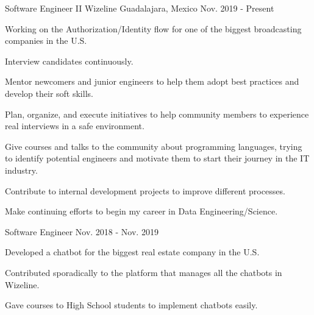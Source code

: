 

\begin{cventries}

  \cventry
    {Software Engineer II} %
    {Wizeline} %
    {Guadalajara, Mexico} %
    {Nov. 2019 - Present} %
    {
      \begin{cvitems} %
        \item {Working on the Authorization/Identity flow for one of the biggest broadcasting companies in the U.S.}
        \item {Interview candidates continuously.}
        \item {Mentor newcomers and junior engineers to help them adopt best practices and develop their soft skills.}
        \item {Plan, organize, and execute initiatives to help community members to experience real interviews in a safe environment.}
        \item {Give courses and talks to the community about programming languages, trying to identify potential engineers and motivate them to start their journey in the IT industry.}
        \item {Contribute to internal development projects to improve different processes.}
        \item {Make continuing efforts to begin my career in Data Engineering/Science.}
      \end{cvitems}
    }
    
  \cventry
    {Software Engineer} %
    {} %
    {} %
    {Nov. 2018 - Nov. 2019} %
    {
      \begin{cvitems} %
        \item {Developed a chatbot for the biggest real estate company in the U.S.}
        \item {Contributed sporadically to the platform that manages all the chatbots in Wizeline.}
        \item {Gave courses to High School students to implement chatbots easily.}
      \end{cvitems}
    }
    

\end{cventries}
